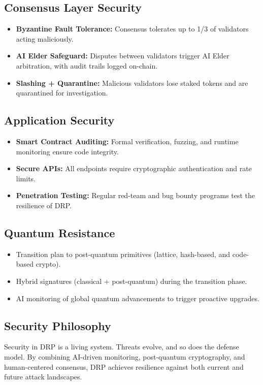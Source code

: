 \documentclass[11pt,a4paper]{article}
\begin{document}
\subsection{Consensus Layer Security}
\begin{itemize}
    \item \textbf{Byzantine Fault Tolerance:} Consensus tolerates up to 1/3 of validators acting maliciously.  
    \item \textbf{AI Elder Safeguard:} Disputes between validators trigger AI Elder arbitration, with audit trails logged on-chain.  
    \item \textbf{Slashing + Quarantine:} Malicious validators lose staked tokens and are quarantined for investigation.  
\end{itemize}

\subsection{Application Security}
\begin{itemize}
    \item \textbf{Smart Contract Auditing:} Formal verification, fuzzing, and runtime monitoring ensure code integrity.  
    \item \textbf{Secure APIs:} All endpoints require cryptographic authentication and rate limits.  
    \item \textbf{Penetration Testing:} Regular red-team and bug bounty programs test the resilience of DRP.  
\end{itemize}

\subsection{Quantum Resistance}
\begin{itemize}
    \item Transition plan to post-quantum primitives (lattice, hash-based, and code-based crypto).  
    \item Hybrid signatures (classical + post-quantum) during the transition phase.  
    \item AI monitoring of global quantum advancements to trigger proactive upgrades.  
\end{itemize}

\subsection{Security Philosophy}
Security in DRP is a living system. Threats evolve, and so does the defense model. By combining AI-driven monitoring, post-quantum cryptography, and human-centered consensus, DRP achieves resilience against both current and future attack landscapes.  
\end{document}
